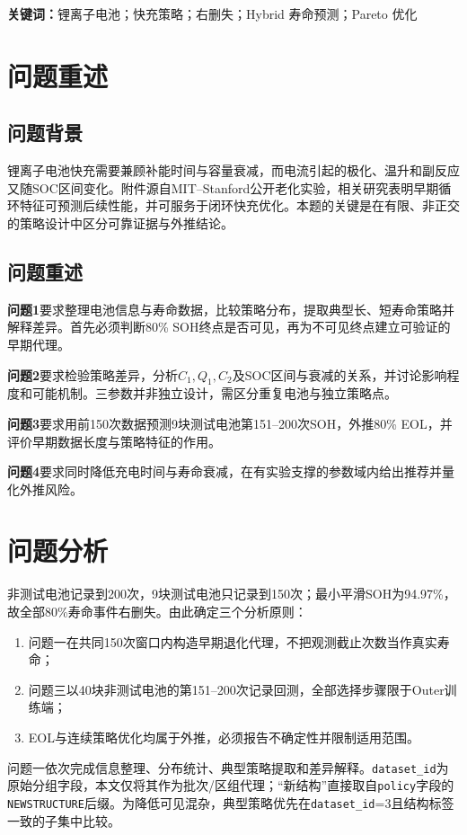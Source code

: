 \documentclass[withoutpreface]{cumcmthesis}
\begin{document}
\noindent\textbf{关键词：}锂离子电池；快充策略；右删失；Hybrid 寿命预测；Pareto 优化


\clearpage

\section{问题重述}
\subsection{问题背景}
锂离子电池快充需要兼顾补能时间与容量衰减，而电流引起的极化、温升和副反应又随SOC区间变化。附件源自MIT--Stanford公开老化实验，相关研究表明早期循环特征可预测后续性能，并可服务于闭环快充优化\cite{severson2019,attia2020}。本题的关键是在有限、非正交的策略设计中区分可靠证据与外推结论。

\subsection{问题重述}
\textbf{问题1}要求整理电池信息与寿命数据，比较策略分布，提取典型长、短寿命策略并解释差异。首先必须判断80\% SOH终点是否可见，再为不可见终点建立可验证的早期代理。

\textbf{问题2}要求检验策略差异，分析$C_1,Q_1,C_2$及SOC区间与衰减的关系，并讨论影响程度和可能机制。三参数并非独立设计，需区分重复电池与独立策略点。

\textbf{问题3}要求用前150次数据预测9块测试电池第151--200次SOH，外推80\% EOL，并评价早期数据长度与策略特征的作用。

\textbf{问题4}要求同时降低充电时间与寿命衰减，在有实验支撑的参数域内给出推荐并量化外推风险。




\section{问题分析}
非测试电池记录到200次，9块测试电池只记录到150次；最小平滑SOH为94.97\%，故全部80\%寿命事件右删失。由此确定三个分析原则：
\begin{enumerate}[label=(\arabic*)]
  \item 问题一在共同150次窗口内构造早期退化代理，不把观测截止次数当作真实寿命；
  \item 问题三以40块非测试电池的第151--200次记录回测，全部选择步骤限于Outer训练端；
  \item EOL与连续策略优化均属于外推，必须报告不确定性并限制适用范围。
\end{enumerate}

问题一依次完成信息整理、分布统计、典型策略提取和差异解释。\texttt{dataset\_id}为原始分组字段，本文仅将其作为批次/区组代理；“新结构”直接取自\texttt{policy}字段的\texttt{NEWSTRUCTURE}后缀。为降低可见混杂，典型策略优先在\texttt{dataset\_id}=3且结构标签一致的子集中比较。
\end{document}
